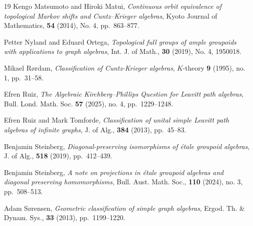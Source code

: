 \documentclass[11pt, letterpaper,final]{amsart}
\theoremstyle{definition}
\theoremstyle{remark}
\begin{document}
\begin{thebibliography}{19}
 Kengo Matsumoto and Hiroki Matui, \emph{Continuous orbit equivalence of
topological Markov shifts and Cuntz–Krieger algebras}, Kyoto Journal of Mathematics, \textbf{54} (2014), No. 4, pp.~863--877.


 Petter Nyland and Eduard Ortega, \emph{Topological full groups of ample groupoids
with applications to graph algebras}, Int. J. of Math., \textbf{30} (2019), No. 4, 1950018.


 Mikael R{\o}rdam, \emph{Classification of Cuntz-Krieger algebras}, $K$-theory \textbf{9} (1995), no. 1, pp.~31--58.

 Efren Ruiz, \emph{The Algebraic Kirchberg–Phillips Question for Leavitt path algebras}, Bull. Lond. Math. Soc. \textbf{57} (2025), no. 4, pp.~1229--1248.

 Efren Ruiz and Mark Tomforde, \emph{Classification of unital simple Leavitt path algebras
of infinite graphs}, J. of Alg., \textbf{384} (2013), pp.~45--83.

 Benjamin Steinberg, \emph{Diagonal-preserving isomorphisms of \'{e}tale groupoid
algebras}, J. of Alg., \textbf{518} (2019), pp.~412--439.

 Benjamin Steinberg, \emph{A note on projections in \'{e}tale groupoid algebras and diagonal preserving homomorphisms}, Bull. Aust. Math. Soc., \textbf{110} (2024), no. 3, pp.~508--513.

 Adam S{\o}rensen, \emph{Geometric classification of simple graph algebras}, Ergod. Th. \& Dynam. Sys., \textbf{33} (2013), pp.~1199--1220.



\end{thebibliography}
\end{document}
